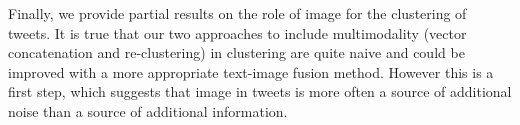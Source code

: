Finally, we provide partial results on the role of image for the clustering of tweets. It is true that our two approaches to include multimodality (vector concatenation and re-clustering) in clustering are quite naive and could be improved with a more appropriate text-image fusion method. However this is a first step, which suggests that image in tweets is more often a source of additional noise than a source of additional information.



